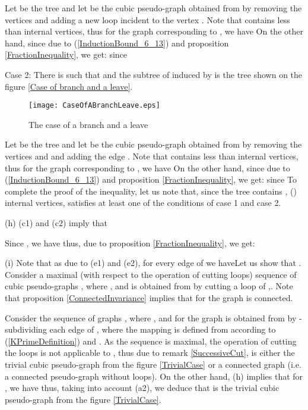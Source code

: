 \documentclass[fleqn,12pt,twoside]{article}
\newenvironment{proof}[1][Proof.]{\begin{trivlist}
\item[\hskip \labelsep {\bfseries #1}]}{\end{trivlist}}
\begin{document}
\begin{proof}
Let  be the tree  and let  be the cubic
pseudo-graph obtained from  by removing the vertices
 and adding a new loop incident to the vertex
. Note that  contains less than 
internal vertices, thus for the graph 
corresponding to , we have
On the other hand, since
due to (\ref{InductionBound_6_13}) and proposition
\ref{FractionInequality}, we get:
since


Case 2: There is  such that 
and
the subtree of  induced by  is the tree shown on the figure \ref{Case of branch and a leave}.

\begin{figure}[h]
\begin{center}
\texttt{[image: CaseOfABranchLeave.eps]}\\
\caption{The case of a branch and a leave}\label{Case of branch and
a leave}
\end{center}
\end{figure}

Let  be the tree  and let  be the
cubic pseudo-graph obtained from  by removing the vertices  and  and adding the edge .
Note that  contains less than  internal
vertices, thus
for the graph  corresponding to , we have
On the other hand, since
due to (\ref{InductionBound_6_13}) and proposition
\ref{FractionInequality}, we get:
since
To complete the proof of the inequality, let us note that, since the tree  contains , () internal vertices,
 satisfies at least one of the conditions of case 1 and
case 2.

(h) (c1) and (c2) imply that

Since ,  we have
thus, due to proposition \ref{FractionInequality}, we get:

(i) Note that as  due to (e1) and (e2), for every
edge 
of  we haveLet us show that . Consider a maximal (with
respect to
the operation of cutting loops) sequence of cubic pseudo-graphs , where , and  is obtained from  by cutting a loop  of ,. Note that proposition
\ref{ConnectedInvariance} implies that for  the graph
 is connected.

Consider the sequence of graphs , where , and for  the graph  is obtained from  by -subdividing each edge  of , where the mapping  is defined from  according to (\ref {KPrimeDefinition}) and . As the sequence  is maximal, the operation
of cutting the loops is not applicable to , thus due to
remark \ref{SuccessiveCut},  is either the trivial
cubic pseudo-graph from the figure \ref{TrivialCase} or a connected
graph (i.e. a connected pseudo-graph without loops). On the other
hand, (h) implies that for , we have
thus, taking into account (a2), we deduce that  is the
trivial cubic pseudo-graph from the figure \ref{TrivialCase}.


\end{proof}
\end{document}
